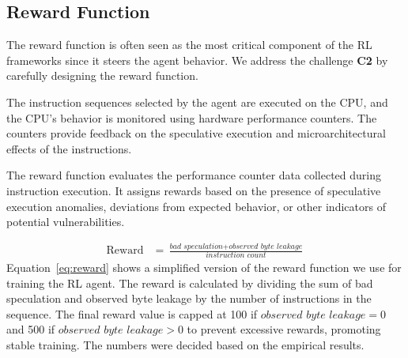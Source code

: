 \subsection{Reward Function}\label{sec:reward}

The reward function is often seen as the most critical component of the RL frameworks since it steers the agent behavior. We address the challenge \textbf{C2} by carefully designing the reward function.

The instruction sequences selected by the agent are executed on the CPU, and the CPU's behavior is monitored using hardware performance counters. The counters provide feedback on the speculative execution and microarchitectural effects of the instructions.

The reward function evaluates the performance counter data collected during instruction execution. It assigns rewards based on the presence of speculative execution anomalies, deviations from expected behavior, or other indicators of potential vulnerabilities. 
    
%
\begin{equation}\label{eq:reward}
    \begin{aligned}
        \text{Reward} &= \frac{\textit{bad speculation} + \textit{observed byte leakage} }{\textit{instruction count}}
    \end{aligned}
\end{equation}
%
Equation~\ref{eq:reward} shows a simplified version of the reward function we use for training the RL agent. The reward is calculated by dividing the sum of bad speculation and observed byte leakage by the number of instructions in the sequence. 
The final reward value is capped at 100 if $\textit{observed byte leakage} = 0$ and 500 if $\textit{observed byte leakage}>0$ to prevent excessive rewards, promoting stable training. The numbers were decided based on the empirical results.

